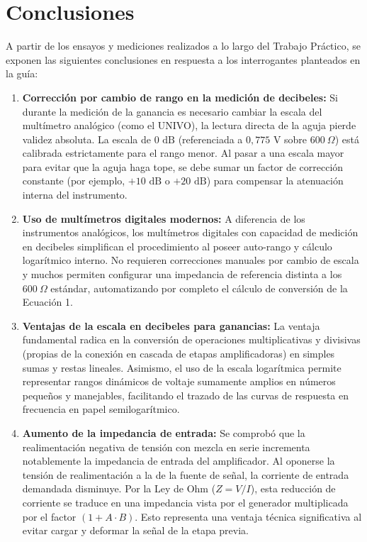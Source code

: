 \section{Conclusiones}



A partir de los ensayos y mediciones realizados a lo largo del Trabajo Práctico, se exponen las siguientes conclusiones en respuesta a los interrogantes planteados en la guía:

\begin{enumerate}
    \item \textbf{Corrección por cambio de rango en la medición de decibeles:} Si durante la medición de la ganancia es necesario cambiar la escala del multímetro analógico (como el UNIVO), la lectura directa de la aguja pierde validez absoluta. La escala de $0\text{ dB}$ (referenciada a $0,775\text{ V}$ sobre $600\ \Omega$) está calibrada estrictamente para el rango menor. Al pasar a una escala mayor para evitar que la aguja haga tope, se debe sumar un factor de corrección constante (por ejemplo, $+10\text{ dB}$ o $+20\text{ dB}$) para compensar la atenuación interna del instrumento.

    \item \textbf{Uso de multímetros digitales modernos:} A diferencia de los instrumentos analógicos, los multímetros digitales con capacidad de medición en decibeles simplifican el procedimiento al poseer auto-rango y cálculo logarítmico interno. No requieren correcciones manuales por cambio de escala y muchos permiten configurar una impedancia de referencia distinta a los $600\ \Omega$ estándar, automatizando por completo el cálculo de conversión de la Ecuación 1.

    \item \textbf{Ventajas de la escala en decibeles para ganancias:} La ventaja fundamental radica en la conversión de operaciones multiplicativas y divisivas (propias de la conexión en cascada de etapas amplificadoras) en simples sumas y restas lineales. Asimismo, el uso de la escala logarítmica permite representar rangos dinámicos de voltaje sumamente amplios en números pequeños y manejables, facilitando el trazado de las curvas de respuesta en frecuencia en papel semilogarítmico.

    \item \textbf{Aumento de la impedancia de entrada:} Se comprobó que la realimentación negativa de tensión con mezcla en serie incrementa notablemente la impedancia de entrada del amplificador. Al oponerse la tensión de realimentación a la de la fuente de señal, la corriente de entrada demandada disminuye. Por la Ley de Ohm ($Z = V/I$), esta reducción de corriente se traduce en una impedancia vista por el generador multiplicada por el factor $(1 + A \cdot B)$. Esto representa una ventaja técnica significativa al evitar cargar y deformar la señal de la etapa previa.


\end{enumerate}
